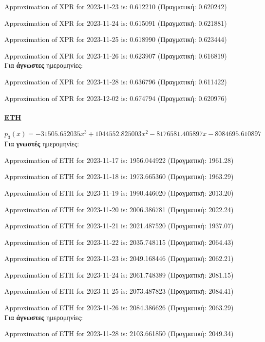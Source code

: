 \documentclass[a4paper, 14pt]{article}   %
\begin{document}
Approximation of XPR for 2023-11-23 is: 0.612210 \small{(Πραγματική: 0.620242)}

Approximation of XPR for 2023-11-24 is: 0.615091 \small{(Πραγματική: 0.621881)}

Approximation of XPR for 2023-11-25 is: 0.618990 \small{(Πραγματική: 0.623444)}

Approximation of XPR for 2023-11-26 is: 0.623907 \small{(Πραγματική: 0.616819)}\\

Για \textbf{άγνωστες} ημερομηνίες:

Approximation of XPR for 2023-11-28 is: 0.636796 \small{(Πραγματική: 0.611422)}

Approximation of XPR for 2023-12-02 is: 0.674794 \small{(Πραγματική: 0.620976)}\\\\

\textbf{\underline{ETH}}

$p_3(x) = -31505.652035x^3 + 1044552.825003x^2 - 8176581.405897x - 8084695.610897$\\

Για \textbf{γνωστές} ημερομηνίες:

Approximation of ETH for 2023-11-17 is: 1956.044922 \small{(Πραγματική: 1961.28)}

Approximation of ETH for 2023-11-18 is: 1973.665360 \small{(Πραγματική: 1963.29)}

Approximation of ETH for 2023-11-19 is: 1990.446020 \small{(Πραγματική: 2013.20)}

Approximation of ETH for 2023-11-20 is: 2006.386781 \small{(Πραγματική: 2022.24)}

Approximation of ETH for 2023-11-21 is: 2021.487520 \small{(Πραγματική: 1937.07)}

Approximation of ETH for 2023-11-22 is: 2035.748115 \small{(Πραγματική: 2064.43)}

Approximation of ETH for 2023-11-23 is: 2049.168446 \small{(Πραγματική: 2062.21)}

Approximation of ETH for 2023-11-24 is: 2061.748389 \small{(Πραγματική: 2081.15)}

Approximation of ETH for 2023-11-25 is: 2073.487823 \small{(Πραγματική: 2084.41)}

Approximation of ETH for 2023-11-26 is: 2084.386626 \small{(Πραγματική: 2063.29)}\\

Για \textbf{άγνωστες} ημερομηνίες:

Approximation of ETH for 2023-11-28 is: 2103.661850 \small{(Πραγματική: 2049.34)}
\end{document}
